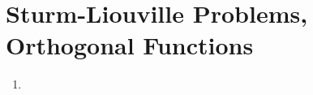 \section{Sturm-Liouville Problems, Orthogonal Functions}

\begin{enumerate}
    \item
\end{enumerate}
